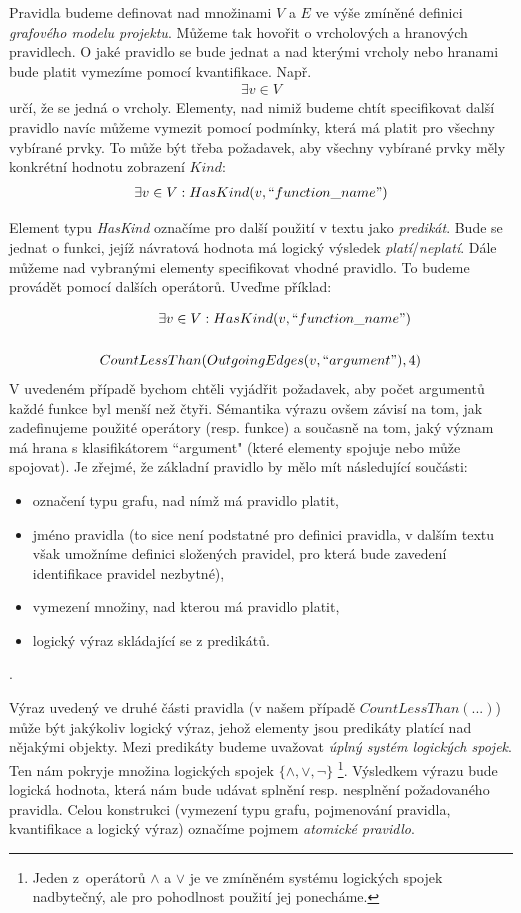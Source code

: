 Pravidla budeme definovat nad množinami $V$ a $E$ ve výše zmíněné definici \emph{grafového modelu projektu}. Můžeme tak hovořit o vrcholových a hranových pravidlech. O jaké pravidlo se bude jednat a nad kterými vrcholy nebo hranami bude platit vymezíme pomocí kvantifikace. Např.
\begin{align*}
\exists v \in V
\end{align*}
určí, že se jedná o vrcholy. Elementy, nad nimiž budeme chtít specifikovat další pravidlo navíc můžeme vymezit pomocí podmínky, která má platit pro všechny vybírané prvky. To může být třeba požadavek, aby všechny vybírané prvky měly konkrétní hodnotu zobrazení $Kind$:
\begin{align*}
\exists v \in V : HasKind(v, ``function\_name")
\end{align*}

Element typu \emph{HasKind} označíme pro další použití v textu jako \emph{predikát}. Bude se jednat o funkci, jejíž návratová hodnota má logický výsledek \emph{platí}/\emph{neplatí}. Dále můžeme nad vybranými elementy specifikovat vhodné pravidlo. To budeme provádět pomocí dalších operátorů. Uveďme příklad:

\begin{align*}
\exists v \in V &: HasKind(v, ``function\_name") \\
\\
CountLessThan&(OutgoingEdges(v, ``argument"), 4)
\end{align*}
V uvedeném případě bychom chtěli vyjádřit požadavek, aby počet argumentů každé funkce byl menší než čtyři. Sémantika výrazu ovšem závisí na tom, jak zadefinujeme použité operátory (resp. funkce) a současně na tom, jaký význam má hrana s klasifikátorem ``argument" (které elementy spojuje nebo může spojovat). Je zřejmé, že základní pravidlo by mělo mít následující součásti:

\begin{itemize}
\item označení typu grafu, nad nímž má pravidlo platit,
\item jméno pravidla (to sice není podstatné pro definici pravidla, v dalším textu však umožníme definici složených pravidel, pro která bude zavedení identifikace pravidel nezbytné),
\item vymezení množiny, nad kterou má pravidlo platit,
\item logický výraz skládající se z predikátů.
\end{itemize}.

Výraz uvedený ve druhé části pravidla (v našem případě $CountLessThan(...)$) může být jakýkoliv logický výraz, jehož elementy jsou predikáty platící nad nějakými objekty. Mezi predikáty budeme uvažovat \emph{úplný systém logických spojek}. Ten nám pokryje množina logických spojek $\{\wedge, \vee, \neg\}$ \footnote{Jeden z~operátorů $\wedge$ a $\vee$ je ve zmíněném systému logických spojek nadbytečný, ale pro pohodlnost použití jej ponecháme.}. Výsledkem výrazu bude logická hodnota, která nám bude udávat splnění resp. nesplnění požadovaného pravidla. Celou konstrukci (vymezení typu grafu, pojmenování pravidla, kvantifikace a logický výraz) označíme pojmem \emph{atomické pravidlo}.

